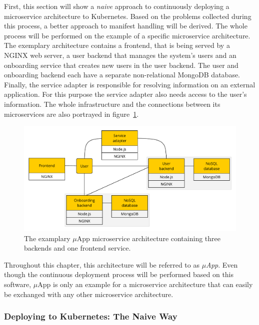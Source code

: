 First, this section will show a \textit{naive} approach to continuously
deploying a microservice architecture to Kubernetes. Based on the problems
collected during this process, a better approach to manifest handling will be
derived. The whole process will be performed on the example of a specific
microservice architecture. The exemplary architecture contains a frontend, that
is being served by a NGINX web server, a user backend that manages the system's
users and an onboarding service that creates new users in the user backend. The
user and onboarding backend each have a separate non-relational MongoDB
database. Finally, the service adapter is responsible for resolving information
on an external application. For this purpose the service adapter also needs
access to the user's information. The whole infrastructure and the connections
between its microservices are also portrayed in figure~\ref{fig:dsp_excerpt}.

\begin{figure}[H]
\begin{center}
  \includegraphics[scale=0.7]{images/figures/dspIT_excerpt.pdf}
\end{center}
\caption{The examplary $\mu$App microservice architecture containing three
backends and one frontend service.}%
\label{fig:dsp_excerpt}
\end{figure}

Throughout this chapter, this architecture will be referred to as
\textit{$\mu$App}. Even though the continuous deployment process will be
performed based on this software, $\mu$App is only an example for a
microservice architecture that can easily be exchanged with any other
microservice architecture.

\subsubsection{Deploying to Kubernetes: The Naive Way}%
\label{ssub:Deploying_to_Kubernetes_The_Naive_Way}


